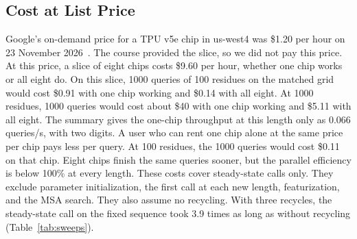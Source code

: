 \subsection{Cost at List Price}\label{sec:res-cost}
Google's on-demand price for a TPU v5e chip in us-west4 was \$1.20 per hour on 23 November 2026~\cite{googletpupricing}. %
The course provided the slice, so we did not pay this price.
At this price, a slice of eight chips costs \$9.60 per hour, whether one chip works or all eight do. %
On this slice, 1000 queries of 100 residues on the matched grid would cost \$0.91 with one chip working and \$0.14 with all eight. %
At 1000 residues, 1000 queries would cost about \$40 with one chip working and \$5.11 with all eight. %
The summary gives the one-chip throughput at this length only as 0.066 queries/s, with two digits. %
A user who can rent one chip alone at the same price per chip pays less per query.
At 100 residues, the 1000 queries would cost \$0.11 on that chip. %
Eight chips finish the same queries sooner, but the parallel efficiency is below 100\% at every length. These costs
cover steady-state calls only. They exclude parameter initialization, the first call at each new length,
featurization, and the MSA search. They also assume no recycling.
With three recycles, the steady-state call on the fixed sequence took 3.9 times as long as without recycling (Table~\ref{tab:sweeps}). %

